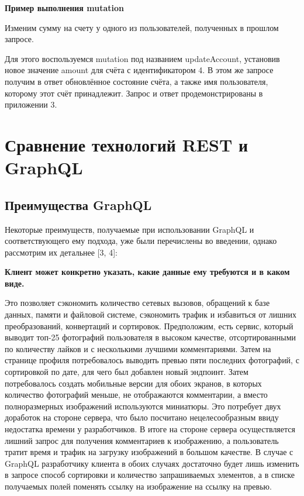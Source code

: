 \textbf{Пример выполнения mutation}

Изменим сумму на счету у одного из пользователей, полученных в прошлом запросе.

Для этого воспользуемся mutation под названием updateAccount, установив новое значение amount для счёта с идентификатором 4.
В этом же запросе получим в ответ обновлённое состояние счёта, а также имя пользователя, которому этот счёт принадлежит.
Запрос и ответ продемонстрированы в приложении 3.


\section{Сравнение технологий REST и GraphQL}\label{sec:rest-vs-graphql}

\subsection{Преимущества GraphQL}\label{subsec:graphql-advantages}

Некоторые преимуществ, получаемые при использовании GraphQL и соответствующего ему подхода, уже были перечислены во введении, однако рассмотрим их детальнее [3, 4]:

\textbf{Клиент может конкретно указать, какие данные ему требуются и в каком виде.}

Это позволяет сэкономить количество сетевых вызовов, обращений к базе данных, памяти и файловой системе, сэкономить трафик и избавиться от лишних преобразований, конвертаций и сортировок.
Предположим, есть сервис, который выводит топ-25 фотографий пользователя в высоком качестве, отсортированными по количеству лайков и с несколькими лучшими комментариями.
Затем на странице профиля потребовалось выводить превью пяти последних фотографий, с сортировкой по дате, для чего был добавлен новый эндпоинт.
Затем потребовалось создать мобильные версии для обоих экранов, в которых количество фотографий меньше, не отображаются комментарии, а вместо полноразмерных изображений используются миниатюры.
Это потребует двух доработок на стороне сервера, что было посчитано нецелесообразным ввиду недостатка времени у разработчиков.
В итоге на стороне сервера осуществляется лишний запрос для получения комментариев к изображению, а пользователь тратит время и трафик на загрузку изображений в большом качестве.
В случае с GraphQL разработчику клиента в обоих случаях достаточно будет лишь изменить в запросе способ сортировки и количество запрашиваемых элементов, а в списке получаемых полей поменять ссылку на изображение на ссылку на превью.

